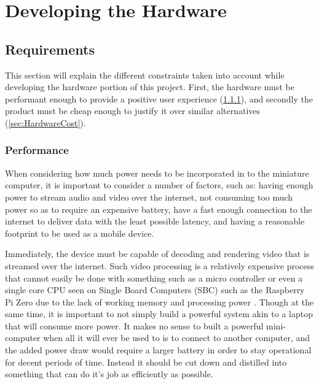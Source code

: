 \chapter{Developing the Hardware} %

\label{Chapter4} %

\todosection

\section{Requirements}\label{sec:HardwareRequirements}

This section will explain the different constraints taken into account while developing the hardware portion of this project.
First, the hardware must be performant enough to provide a positive user experience (\ref{sec:HardwarePerformance}), and secondly the product must be cheap enough to justify it over similar alternatives (\ref{sec:HardwareCost}).

\subsection{Performance}\label{sec:HardwarePerformance}

When considering how much power needs to be incorporated in to the miniature computer, it is important to consider a number of factors, such as: having enough power to stream audio and video over the internet, not consuming too much power so as to require an expensive battery, have a fast enough connection to the internet to deliver data with the least possible latency, and having a reasonable footprint to be used as a mobile device.

Immediately, the device must be capable of decoding and rendering video that is streamed over the internet.
Such video processing is a relatively expensive process that cannot easily be done with something such as a micro controller or even a single core CPU seen on Single Board Computers (SBC) such as the Raspberry Pi Zero due to the lack of working memory and processing power \cite{picockpit_2021}.
Though at the same time, it is important to not simply build a powerful system akin to a laptop that will consume more power.
It makes no sense to built a powerful mini-computer when all it will ever be used to is to connect to another computer, and the added power draw would require a larger battery in order to stay operational for decent periods of time.
Instead it should be cut down and distilled into something that can do it's job as efficiently as possible.

